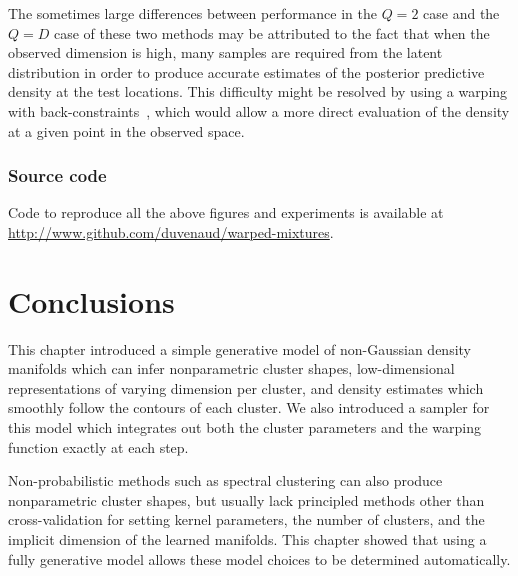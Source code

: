 The sometimes large differences between performance in the $Q = 2$ case and the $Q = D$ case of these two methods may be attributed to the fact that when the observed dimension is high, many samples are required from the latent distribution in order to produce accurate estimates of the posterior predictive density at the test locations.
This difficulty might be resolved by using a warping with back-constraints~\citep{Lawrence06localdistance}, which would allow a more direct evaluation of the density at a given point in the observed space.




\subsubsection{Source code}
Code to reproduce all the above figures and experiments is available at \\\url{http://www.github.com/duvenaud/warped-mixtures}.


\section{Conclusions}

This chapter introduced a simple generative model of non-Gaussian density manifolds which can infer nonparametric cluster shapes, low-dimensional representations of varying dimension per cluster, and density estimates which smoothly follow the contours of each cluster.
We also introduced a sampler for this model which integrates out both the cluster parameters and the warping function exactly at each step.

Non-probabilistic methods such as spectral clustering can also produce nonparametric cluster shapes, but usually lack principled methods other than cross-validation for setting kernel parameters, the number of clusters, and the implicit dimension of the learned manifolds.
This chapter showed that using a fully generative model allows these model choices to be determined automatically.


